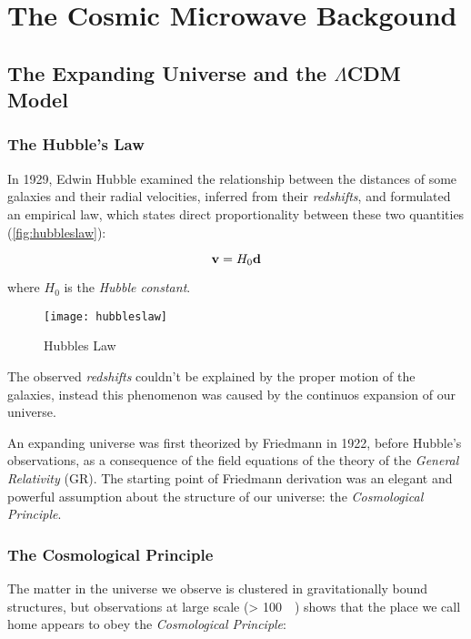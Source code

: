 \chapter{The Cosmic Microwave Backgound}

\section{The Expanding Universe and the \texorpdfstring{$\Lambda$}{LAMBDA-}CDM Model}
\subsection{The Hubble's Law}\label{ss:hubbleslaw}

In 1929, Edwin Hubble examined the relationship between the distances of
some galaxies and their radial velocities, inferred from their \emph{redshifts},
and formulated an empirical law, which states direct proportionality
between these two quantities (\autoref{fig:hubbleslaw}):

\begin{equation}\label{eq:hubble_law}
        \vb{v} = H_0 \vb{d}
\end{equation}

where $H_0$ is the \emph{Hubble constant}.

\begin{figure}
        \centering
        \texttt{[image: hubbleslaw]}
        \caption{Hubbles Law}
        \label{fig:hubbleslaw}
\end{figure}

The observed \emph{redshifts} couldn't be explained by the proper motion of
the galaxies, instead this phenomenon was caused by the continuos expansion
of our universe.

An expanding universe was first theorized by Friedmann in 1922, before Hubble's
observations, as a consequence of the field equations of the theory of the
\emph{General Relativity} (GR). The starting point of Friedmann derivation was
an elegant and powerful assumption about the structure of our universe:
the \emph{Cosmological Principle}.

\subsection{The Cosmological Principle}\label{ss:cosmological_principle}

The matter in the universe we observe is clustered in gravitationally bound
structures, but observations at large scale (\SI{> 100}{\mega\parsec}) shows
that the place we call home appears to obey the \emph{Cosmological
Principle}:

